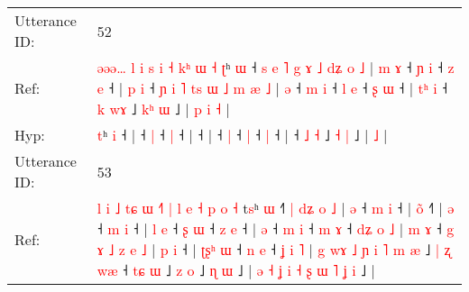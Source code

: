 \documentclass[10pt]{article}
\DeclareRobustCommand{\hl}[1]{{\textcolor{red}{#1}}}
\begin{document}
\begin{longtable}{ll}
 \\
\midrule
Utterance ID: & 52 \\
Ref: & \hl{ə}\hl{ə}\hl{ə}\hl{…}\hl{ }\hl{l}\hl{ }\hl{i}\hl{ }\hl{s}\hl{ }\hl{i}\hl{ }\hl{˧}\hl{ }\hl{k}\hl{ʰ}\hl{ }\hl{ɯ}\hl{ }\hl{˧}\hl{ }\hl{ʈ}ʰ \hl{ɯ} ˧\hl{ }\hl{s}\hl{ }\hl{e}\hl{ }\hl{˥}\hl{ }\hl{g}\hl{ }\hl{ɤ}\hl{ }\hl{˩}\hl{ }\hl{d}\hl{ʑ}\hl{ }\hl{o}\hl{ }\hl{˩} |\hl{ }\hl{m}\hl{ }\hl{ɤ} ˧\hl{ }\hl{ɲ} \hl{i} ˧\hl{ }\hl{z} \hl{e} ˧ |\hl{ }\hl{p}\hl{ }\hl{i} ˧\hl{ }\hl{ɲ}\hl{ }\hl{i}\hl{ }\hl{˥}\hl{ }\hl{t}\hl{s}\hl{ }\hl{ɯ}\hl{ }\hl{˩}\hl{ }\hl{m}\hl{ }\hl{æ}\hl{ }\hl{˩} |\hl{ }\hl{ə} ˧\hl{ }\hl{m} \hl{i} ˧\hl{ }\hl{l} \hl{e} ˧\hl{ }\hl{ʂ} \hl{ɯ} ˧ |\hl{ }\hl{t}\hl{ʰ}\hl{ }\hl{i} ˧ \hl{k} \hl{w}\hl{ɤ} ˩ \hl{k}\hl{ʰ} \hl{ɯ} ˩ |\hl{ }\hl{p}\hl{ }\hl{i} \hl{˧} |
 \\
Hyp: & \hl{}\hl{}\hl{}\hl{}\hl{}\hl{}\hl{}\hl{}\hl{}\hl{}\hl{}\hl{}\hl{}\hl{}\hl{}\hl{}\hl{}\hl{}\hl{}\hl{}\hl{}\hl{}\hl{t}ʰ \hl{i} ˧\hl{}\hl{}\hl{}\hl{}\hl{}\hl{}\hl{}\hl{}\hl{}\hl{}\hl{}\hl{}\hl{}\hl{}\hl{}\hl{}\hl{}\hl{}\hl{} |\hl{}\hl{}\hl{}\hl{} ˧\hl{}\hl{} \hl{|} ˧\hl{}\hl{} \hl{|} ˧ |\hl{}\hl{}\hl{}\hl{} ˧\hl{}\hl{}\hl{}\hl{}\hl{}\hl{}\hl{}\hl{}\hl{}\hl{}\hl{}\hl{}\hl{}\hl{}\hl{}\hl{}\hl{}\hl{}\hl{} |\hl{}\hl{} ˧\hl{}\hl{} \hl{|} ˧\hl{}\hl{} \hl{|} ˧\hl{}\hl{} \hl{|} ˧ |\hl{}\hl{}\hl{}\hl{}\hl{} ˧ \hl{˩} \hl{}\hl{˧} ˩ \hl{}\hl{˧} \hl{|} ˩ |\hl{}\hl{}\hl{}\hl{} \hl{˩} |
 \\
\midrule
Utterance ID: & 53 \\
Ref: & \hl{l}\hl{ }\hl{i}\hl{ }\hl{˩}\hl{ }\hl{t}\hl{ɕ}\hl{ }\hl{ɯ}\hl{ }\hl{˧}\hl{˥}\hl{ }\hl{|}\hl{ }\hl{l}\hl{ }\hl{e}\hl{ }\hl{˧}\hl{ }\hl{p}\hl{ }\hl{o}\hl{ }\hl{˧}\hl{ }t\hl{s}ʰ \hl{ɯ} ˧\hl{˥}\hl{ }\hl{|}\hl{ }\hl{d}\hl{ʑ}\hl{ }\hl{o}\hl{ }\hl{˩} |\hl{ }\hl{ə} ˧\hl{ }\hl{m} \hl{i} ˧ |\hl{ }\hl{o}\hl{̃} ˧\hl{˥} |\hl{ }\hl{ə} ˧\hl{ }\hl{m} \hl{i} ˧ |\hl{ }\hl{l}\hl{ }\hl{e} ˧\hl{ }\hl{ʂ} \hl{ɯ} ˧\hl{ }\hl{z} \hl{e} ˧ |\hl{ }\hl{ə} ˧\hl{ }\hl{m} \hl{i} ˧\hl{ }\hl{m} \hl{ɤ} ˧\hl{ }\hl{d}\hl{ʑ}\hl{ }\hl{o}\hl{ }\hl{˩} |\hl{ }\hl{m}\hl{ }\hl{ɤ} ˧\hl{ }\hl{g}\hl{ }\hl{ɤ}\hl{ }\hl{˩}\hl{ }\hl{z}\hl{ }\hl{e}\hl{ }\hl{˩} |\hl{ }\hl{p}\hl{ }\hl{i} ˧ |\hl{ }\hl{ʈ}\hl{ʂ}\hl{ʰ}\hl{ }\hl{ɯ} ˧\hl{ }\hl{n} \hl{e} ˧\hl{ }\hl{ʝ}\hl{ }\hl{i}\hl{ }\hl{˥} |\hl{ }\hl{g}\hl{ }\hl{w}\hl{ɤ}\hl{ }\hl{˩}\hl{ }\hl{ɲ}\hl{ }\hl{i}\hl{ }\hl{˥}\hl{ }\hl{m} \hl{æ} ˩\hl{ }\hl{|}\hl{ }\hl{ʐ}\hl{ }\hl{w}\hl{æ} ˧\hl{ }\hl{t}\hl{ɕ}\hl{ }\hl{ɯ} ˩\hl{ }\hl{z} \hl{o} ˩\hl{ }\hl{ɳ} \hl{ɯ} ˩ |\hl{ }\hl{ə}\hl{ }\hl{˧}\hl{ }\hl{ʝ}\hl{ }\hl{i}\hl{ }\hl{˧}\hl{ }\hl{ʂ}\hl{ }\hl{ɯ}\hl{ }\hl{˥}\hl{ }\hl{ʝ}\hl{ }\hl{i} ˩ |

\end{longtable}
\end{document}
